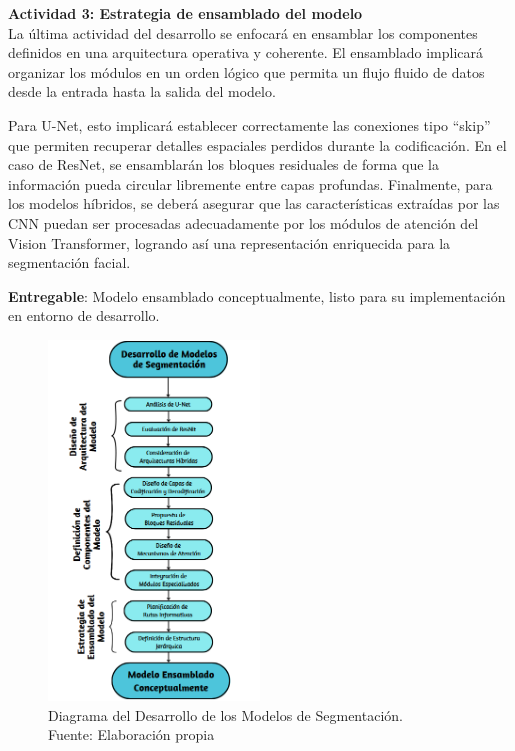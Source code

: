  \textbf{Actividad 3: Estrategia de ensamblado del modelo}
 \\
 La última actividad del desarrollo se enfocará en ensamblar los componentes definidos en una arquitectura operativa y coherente. El ensamblado implicará organizar los módulos en un orden lógico que permita un flujo fluido de datos desde la entrada hasta la salida del modelo.

Para U-Net, esto implicará establecer correctamente las conexiones tipo “skip” que permiten recuperar detalles espaciales perdidos durante la codificación. En el caso de ResNet, se ensamblarán los bloques residuales de forma que la información pueda circular libremente entre capas profundas. Finalmente, para los modelos híbridos, se deberá asegurar que las características extraídas por las CNN puedan ser procesadas adecuadamente por los módulos de atención del Vision Transformer, logrando así una representación enriquecida para la segmentación facial.

 \textbf{Entregable}: Modelo ensamblado conceptualmente, listo para su implementación en entorno de desarrollo.

 
 \begin{figure}[h]
    \begin{center}
        \includegraphics[width=0.5\textwidth]{3/figures/Diagrama de Desarrollo.png}
        \caption[Diagrama del Desarrollo de los Modelos de Segmentación]{Diagrama del Desarrollo de los Modelos de Segmentación.\\
        Fuente: Elaboración propia}
        \label{3:fig5}
    \end{center}
\end{figure}

